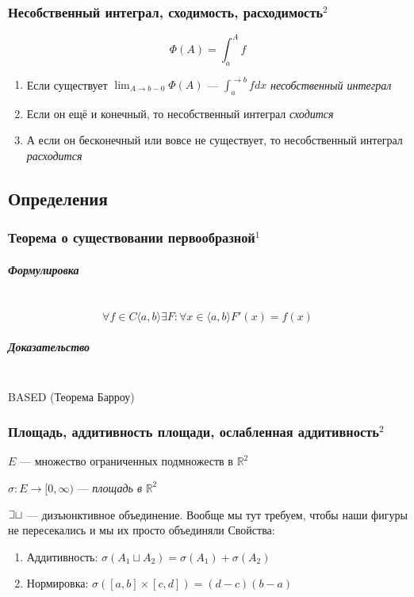 \documentclass{article}
\def\letus{%
\mathord{\setbox0=\hbox{$\exists$}%
         \hbox{\kern 0.125\wd0%
               \vbox to \ht0{%
                  \hrule width 0.75\wd0%
                  \vfill%
                  \hrule width 0.75\wd0}%
               \vrule height \ht0%
               \kern 0.125\wd0}%
       }%
        }
\let\vanillasubparagraph\subparagraph
\renewcommand{\subparagraph}[1]{\vanillasubparagraph{#1}\mbox{}\\}
\begin{document}
\subsubsection{Несобственный интеграл, сходимость, расходимость\texorpdfstring{$^2$}{}}

\[\Phi(A) = \int_a^A f\] 

\begin{enumerate}
    \item Если существует $\lim_{A \rightarrow b - 0}{\Phi(A)}$ --- $\int_a^{\rightarrow b}{f dx}$ \textit{несобственный интеграл}
    \item Если он ещё и конечный, то несобственный интеграл \textit{сходится}
    \item А если он бесконечный или вовсе не существует, то несобственный интеграл \textit{расходится}
\end{enumerate}
\newpage
\subsection{Определения}
\subsubsection{Теорема о существовании первообразной\texorpdfstring{$^1$}{}}
\subparagraph{Формулировка}
$$
\forall f\in C\langle a, b \rangle \exists F : \forall x \in \langle a, b \rangle F'(x) = f(x)
$$

\subparagraph{Доказательство}
BASED (Теорема Барроу)


\subsubsection{Площадь, аддитивность площади, ослабленная аддитивность\texorpdfstring{$^2$}{}}

$E$ --- множество ограниченных подмножеств в $\mathbb{R}^2$

$\sigma: E \rightarrow [0, \infty)$ --- \textit{площадь в} $\mathbb{R}^2$

$\letus \sqcup$ --- дизъюнктивное объединение. Вообще мы тут требуем, чтобы наши фигуры не пересекались и мы их просто объединяли
Свойства:

\begin{enumerate}
    \item Аддитивность: $\sigma(A_1 \sqcup A_2) = \sigma(A_1) + \sigma(A_2)$
    \item Нормировка: $\sigma([a, b] \times [c, d]) = (d - c)(b - a)$
\end{enumerate}
\end{document}
